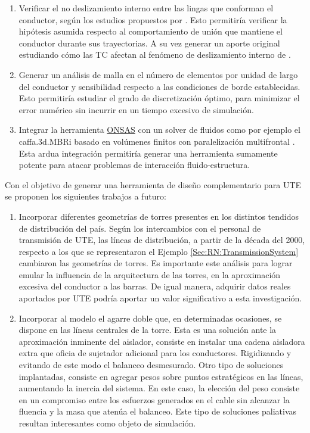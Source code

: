 \begin{enumerate}
	\item Verificar el no deslizamiento interno entre las lingas que conforman el conductor, según los estudios propuestos por \cite{Foti2016}. Esto permitiría verificar la hipótesis asumida respecto al comportamiento de unión que mantiene el conductor durante sus trayectorias. A su vez generar un aporte original estudiando cómo las TC afectan al fenómeno de deslizamiento interno de \cite{Papailiou1997}. 
	\item Generar un análisis de malla en el número de elementos por unidad de largo del conductor y sensibilidad respecto a las condiciones de borde establecidas. Esto permitiría estudiar el grado de discretización óptimo, para minimizar el error numérico sin incurrir en un tiempo excesivo de simulación. 
	\item Integrar la herramienta \href{https://github.com/ONSAS/ONSAS.m/}{ONSAS} con un solver de fluidos como por ejemplo el caffa.3d.MBRi basado en volúmenes finitos con paralelización multifrontal \cite{mendina2014general}. Esta ardua integración permitiría generar una herramienta sumamente potente para atacar problemas de interacción fluido-estructura.	
\end{enumerate}

Con el objetivo de generar una herramienta de diseño complementario para UTE se proponen los siguientes trabajos a futuro:

\begin{enumerate}
	\item Incorporar diferentes geometrías de torres presentes en los distintos tendidos de distribución del país. Según los intercambios con el personal de transmisión de UTE, las líneas de distribución, a partir de la década del 2000, respecto a los que se representaron el Ejemplo \ref{Sec:RN:TransmissionSystem} cambiaron las geometrías de torres. Es importante este análisis para lograr emular la influencia de la arquitectura de las torres, en la aproximación excesiva del conductor a las barras. De igual manera, adquirir datos reales aportados por UTE podría aportar un valor significativo a esta investigación.
	\item Incorporar al modelo el agarre doble que, en determinadas ocasiones, se dispone en las líneas centrales de la torre. Esta es una solución ante la aproximación inminente del aislador, consiste en instalar una cadena aisladora extra que oficia de sujetador adicional para los conductores. Rigidizando y evitando de este modo el balanceo desmesurado. Otro tipo de soluciones implantadas, consiste en agregar pesos sobre puntos estratégicos en las líneas, aumentando la inercia del sistema. En este caso, la elección del peso consiste en un compromiso entre los esfuerzos generados en el cable sin alcanzar la fluencia y la masa que atenúa el balanceo. Este tipo de soluciones paliativas resultan interesantes como objeto de simulación.	
\end{enumerate}



